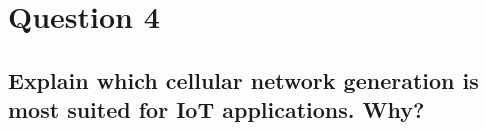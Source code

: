 \documentclass{report}
\begin{document}
	\section{Question 4}
	\startsection
		\renewcommand{\thesubsection}{\thesection.\Alph{subsection}}
		\subsection{Explain which cellular network generation is most suited for IoT applications. Why?}
		\startsubsection
		\closesection
	\closesection
\end{document}
